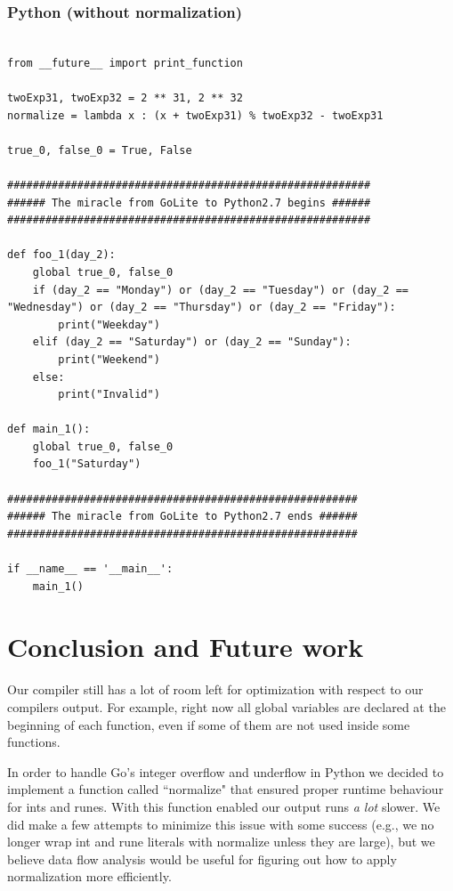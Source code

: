\documentclass{article}
\begin{document}
\subsubsection{Python (without normalization)}
\begin{lstlisting}

from __future__ import print_function

twoExp31, twoExp32 = 2 ** 31, 2 ** 32
normalize = lambda x : (x + twoExp31) % twoExp32 - twoExp31

true_0, false_0 = True, False

#########################################################
###### The miracle from GoLite to Python2.7 begins ######
#########################################################

def foo_1(day_2):
	global true_0, false_0
	if (day_2 == "Monday") or (day_2 == "Tuesday") or (day_2 == "Wednesday") or (day_2 == "Thursday") or (day_2 == "Friday"):
		print("Weekday")
	elif (day_2 == "Saturday") or (day_2 == "Sunday"):
		print("Weekend")
	else:
		print("Invalid")

def main_1():
	global true_0, false_0
	foo_1("Saturday")

#######################################################
###### The miracle from GoLite to Python2.7 ends ######
#######################################################

if __name__ == '__main__':
	main_1()

\end{lstlisting}

\section{Conclusion and Future work}

Our compiler still has a lot of room left for optimization with respect to our compilers output. For example, right now all global variables are declared at the beginning of each function, even if some of them are not used inside some functions.

In order to handle Go's integer overflow and underflow in Python we decided to implement a function called ``normalize" that ensured proper runtime behaviour for ints and runes. With this function enabled our output runs \textit{a lot} slower. We did make a few attempts to minimize this issue with some success (e.g., we no longer wrap int and rune literals with normalize unless they are large), but we believe data flow analysis would be useful for figuring out how to apply normalization more efficiently.
\end{document}
